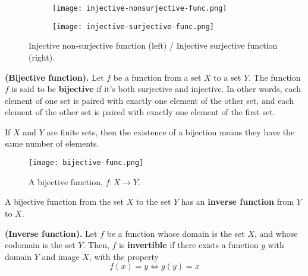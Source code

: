 \begin{figure}[htbp]
    \centering
    \begin{subfigure}{.25\textwidth}
        \texttt{[image: injective-nonsurjective-func.png]}
    \end{subfigure}
    \hspace{1cm}
    \begin{subfigure}{.25\textwidth}
        \texttt{[image: injective-surjective-func.png]}
    \end{subfigure}
    \caption{Injective non-surjective function (left) / Injective surjective function (right).}
\end{figure}

\begin{definition}
    \textbf{(Bijective function).} Let $f$ be a function from a set $X$ to a set $Y$. The function $f$ is said to be \textbf{bijective} if it's both surjective and injective. In other words, each element of one set is paired with exactly one element of the other set, and each element of the other set is paired with exactly one element of the first set.
\end{definition}

\begin{remark}
    If $X$ and $Y$ are finite sets, then the existence of a bijection means they have the same number of elements.
\end{remark}
\begin{figure}[htbp]
    \centerline{\texttt{[image: bijective-func.png]}}
    \caption{A bijective function, $f:X\to Y$.}
\end{figure}

A bijective function from the set $X$ to the set $Y$ has an \textbf{inverse function} from $Y$ to $X$.

\newpage
\begin{definition}
    \textbf{(Inverse function).} Let $f$ be a function whose domain is the set $X$, and whose codomain is the set $Y$. Then, $f$ is \textbf{invertible} if there exists a function $g$ with domain $Y$ and image $X$, with the property
    \begin{equation}
        f\left( x \right) = y \iff g\left( y \right) = x
    \end{equation}
\end{definition}

